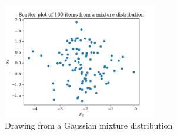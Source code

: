 \documentclass[a4paper]{article}
\theoremstyle{definition}
\newenvironment{soln}{
	\leavevmode\color{blue}\ignorespaces
}{}
\begin{document}
\begin{enumerate}
		\begin{soln}
		\begin{figure}[h!]
		    \centering
		    \includegraphics[width=0.6\textwidth]{../images/7_b.png}  
		    \captionsetup{labelformat=empty}
		    \caption{Drawing from a Gaussian mixture distribution}
		    \label{fig:gauss_mixture}
		\end{figure}
	\end{soln}
	\end{enumerate}
	
	
	
	
	
	
	
\end{document}
